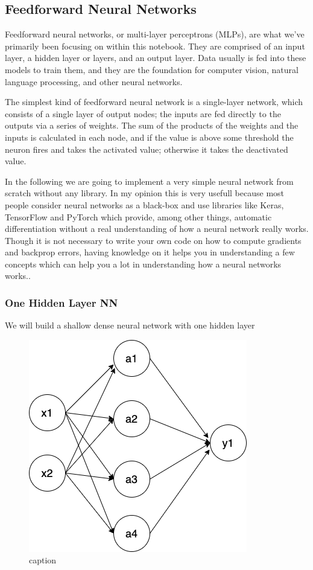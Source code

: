 \documentclass[11pt]{article}
\begin{document}
    \hypertarget{feedforward-neural-networks}{%
\subsection{Feedforward Neural
Networks}\label{feedforward-neural-networks}}

    Feedforward neural networks, or multi-layer perceptrons (MLPs), are what
we've primarily been focusing on within this notebook. They are
comprised of an input layer, a hidden layer or layers, and an output
layer. Data usually is fed into these models to train them, and they are
the foundation for computer vision, natural language processing, and
other neural networks.

The simplest kind of feedforward neural network is a single-layer
network, which consists of a single layer of output nodes; the inputs
are fed directly to the outputs via a series of weights. The sum of the
products of the weights and the inputs is calculated in each node, and
if the value is above some threshold the neuron fires and takes the
activated value; otherwise it takes the deactivated value.

In the following we are going to implement a very simple neural network
from scratch without any library. In my opinion this is very usefull
because most people consider neural networks as a black-box and use
libraries like Keras, TensorFlow and PyTorch which provide, among other
things, automatic differentiation without a real understanding of how a
neural network really works. Though it is not necessary to write your
own code on how to compute gradients and backprop errors, having
knowledge on it helps you in understanding a few concepts which can help
you a lot in understanding how a neural networks works..

    \hypertarget{one-hidden-layer-nn}{%
\subsubsection{One Hidden Layer NN}\label{one-hidden-layer-nn}}

We will build a shallow dense neural network with one hidden layer

    \begin{figure}
\centering
\includegraphics{./pic/chapter-5-1_pic_2.png}
\caption{caption}
\end{figure}
\end{document}
